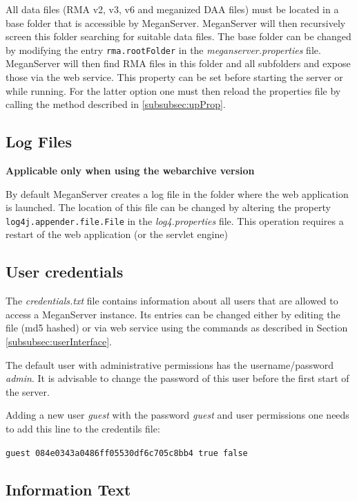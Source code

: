 \documentclass[11pt]{article}
\begin{document}
All data files (RMA v2, v3, v6 and meganized DAA files) must be located in a base folder that is accessible by MeganServer. MeganServer will then recursively screen this folder searching for suitable data files. The base folder can be changed by modifying the entry \texttt{rma.rootFolder} in the \textit{meganserver.properties} file. MeganServer will then find RMA files in this folder and all subfolders and expose those via the web service. This property can be set before starting the server or while running. For the latter option one must then reload the properties file by calling the method described in \ref{subsubsec:upProp}.


\subsection{Log Files}
\textbf{Applicable only when using the webarchive version}

By default MeganServer creates a log file in the folder where the web application is launched. The location of this file can be changed by altering the property \texttt{log4j.appender.file.File} in the \textit{log4.properties} file. This operation requires a restart of the web application (or the servlet engine)

\subsection{User credentials}

The \textit{credentials.txt} file contains information about all users that are allowed to access a MeganServer instance. Its entries can be changed either by editing the file (md5 hashed) or via web service using the commands as described in Section \ref{subsubsec:userInterface}.

The default user with administrative permissions has the username/password \textit{admin}. It is advisable to change the password of this user before the first start of the server.

Adding a new user \textit{guest} with the password \textit{guest} and user permissions one needs to add this line to the credentils file:

\texttt{guest	084e0343a0486ff05530df6c705c8bb4	true	false}




\subsection{Information Text}
\end{document}
